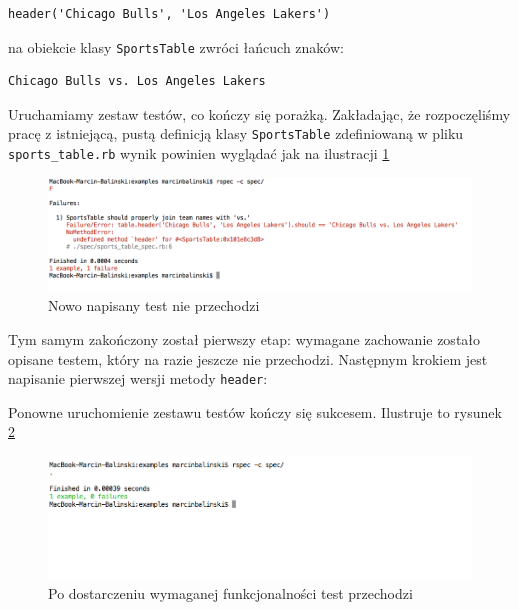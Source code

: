 \begin{lstlisting} 
header('Chicago Bulls', 'Los Angeles Lakers')
\end{lstlisting}
    
    na obiekcie klasy \texttt{SportsTable} zwróci łańcuch znaków:
    
\begin{lstlisting} 
Chicago Bulls vs. Los Angeles Lakers
\end{lstlisting}
    
    Uruchamiamy zestaw testów, co kończy się porażką. Zakładając, że rozpoczęliśmy pracę z istniejącą, pustą definicją klasy \texttt{SportsTable} zdefiniowaną w pliku \texttt{sports\_table.rb} wynik powinien wyglądać jak na ilustracji \ref{example1_failure}
    
    \vspace{5 mm}
     \begin{figure}[!h]
   		\begin{center}
   			\includegraphics[width=\linewidth]{images/example1_failure.png}
   			\caption{Nowo napisany test nie przechodzi}
   			\label{example1_failure}
   		\end{center}
   	\end{figure}
    
    Tym samym zakończony został pierwszy etap: wymagane zachowanie zostało opisane testem, który na razie jeszcze nie przechodzi. Następnym krokiem jest napisanie pierwszej wersji metody \texttt{header}:
    
    
    
    Ponowne uruchomienie zestawu testów kończy się sukcesem. Ilustruje to rysunek \ref{example1_success}
    
     \clearpage
     
     \begin{figure}[!h]
   		\begin{center}
   			\includegraphics[width=\linewidth]{images/example1_success.png}
   			\caption{Po dostarczeniu wymaganej funkcjonalności test przechodzi}
   			\label{example1_success}
   		\end{center}
   	\end{figure}
    
